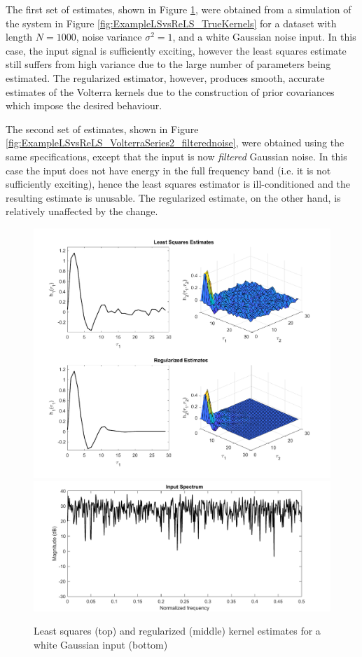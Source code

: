 The first set of estimates, shown in Figure \ref{fig:ExampleLSvsReLS_VolterraSeries2_whitenoise}, were obtained from a simulation of the system in Figure \ref{fig:ExampleLSvsReLS_TrueKernels} for a dataset with length $N=1000$, noise variance $\sigma^2 = 1$, and a white Gaussian noise input. In this case, the input signal is sufficiently exciting, however the least squares estimate still suffers from high variance due to the large number of parameters being estimated. The regularized estimator, however, produces smooth, accurate estimates of the Volterra kernels due to the construction of prior covariances which impose the desired behaviour. 

The second set of estimates, shown in Figure \ref{fig:ExampleLSvsReLS_VolterraSeries2_filterednoise}, were obtained using the same specifications, except that the input is now \emph{filtered} Gaussian noise. In this case the input does not have energy in the full frequency band (i.e. it is not sufficiently exciting), hence the least squares estimator is ill-conditioned and the resulting estimate is unusable. The regularized estimate, on the other hand, is relatively unaffected by the change. 

\begin{figure}[!hp]
\centering
\includegraphics[width = 1.1\textwidth]{Chapter3_VolterraSeries/LSvsReLS_whiteinput.pdf}
\includegraphics[width = 1.1\textwidth]{Chapter3_VolterraSeries/white_spectrum.pdf}
\caption{Least squares (top) and regularized (middle) kernel estimates for a white Gaussian input (bottom)}
\label{fig:ExampleLSvsReLS_VolterraSeries2_whitenoise}
\end{figure}

